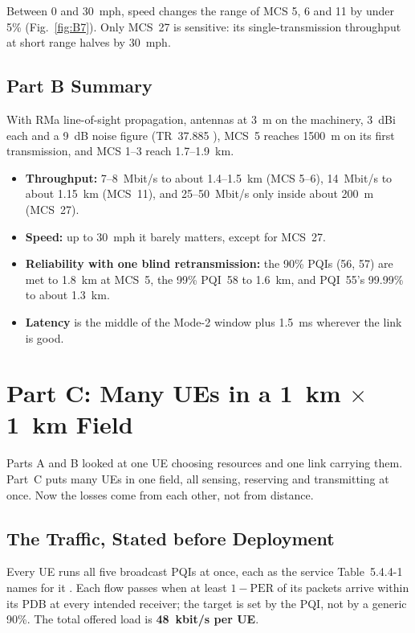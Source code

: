 \documentclass{article}
\begin{document}
Between 0 and 30~mph, speed changes the range of MCS 5, 6 and 11 by
under 5\% (Fig.~\ref{fig:B7}). Only MCS~27 is sensitive: its
single-transmission throughput at short range halves by 30~mph.

\subsection{Part B Summary}

With RMa line-of-sight propagation, antennas at 3~m on the machinery,
3~dBi each and a 9~dB noise figure (TR~37.885 \cite{ref:37885}), MCS~5
reaches 1500~m on its first transmission, and MCS 1--3 reach 1.7--1.9~km.
\begin{itemize}[nosep]
  \item \textbf{Throughput:} 7--8~Mbit/s to about 1.4--1.5~km (MCS 5--6),
  14~Mbit/s to about 1.15~km (MCS~11), and 25--50~Mbit/s only inside
  about 200~m (MCS~27).
  \item \textbf{Speed:} up to 30~mph it barely matters, except for MCS~27.
  \item \textbf{Reliability with one blind retransmission:} the 90\% PQIs
  (56, 57) are met to 1.8~km at MCS~5, the 99\% PQI~58 to 1.6~km, and
  PQI~55's 99.99\% to about 1.3~km.
  \item \textbf{Latency} is the middle of the Mode-2 window plus 1.5~ms
  wherever the link is good.
\end{itemize}

\newpage
\section{Part C: Many UEs in a 1~km $\times$ 1~km Field}
\label{sec:partC}

Parts A and B looked at one UE choosing resources and one link carrying
them. Part~C puts many UEs in one field, all sensing, reserving and
transmitting at once. Now the losses come from each other, not from
distance.

\subsection{The Traffic, Stated before Deployment}
\label{sec:traffic}

Every UE runs all five broadcast PQIs at once, each as the service
Table~5.4.4-1 names for it \cite{ref:23287}. Each flow passes when at
least $1 - \mathrm{PER}$ of its packets arrive within its PDB at every
intended receiver; the target is set by the PQI, not by a generic 90\%.
The total offered load is \textbf{48~kbit/s per UE}.
\end{document}
